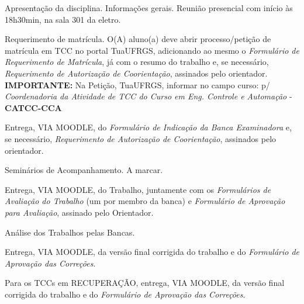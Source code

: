 

    {Apresentação da disciplina. Informações gerais. Reunião presencial com início às 18h30min, na sala 301 da eletro.}

    {Requerimento de matrícula. O(A) aluno(a) deve abrir processo/petição de matrícula em TCC no portal TuaUFRGS, adicionando ao mesmo o \emph{Formulário de Requerimento de Matrícula}, já com o resumo do trabalho e, se necessário, \emph{Requerimento de Autorização de Coorientação}, assinados pelo orientador.
    \newline \textbf{IMPORTANTE:} Na Petição, TuaUFRGS, informar no campo curso: p/ \emph{Coordenadoria da Atividade de TCC do Curso em Eng. Controle e Automação} - \textbf{CATCC-CCA}
     }


    {Entrega, VIA MOODLE, do  \emph{Formulário de Indicação da Banca Examinadora} e, se necessário, \emph{Requerimento de Autorização de Coorientação}, assinados pelo orientador. }

    {
     Seminários de Acompanhamento. A marcar. 
    }

    {Entrega, VIA MOODLE, do Trabalho, juntamente com os \emph{Formulários de Avaliação do Trabalho} (um por membro da banca) e \emph{Formulário de Aprovação para Avaliação}, assinado pelo Orientador.}

    {Análise dos Trabalhos pelas Bancas.}%

    {Entrega, VIA MOODLE, da versão final corrigida do trabalho e do \emph{Formulário de Aprovação das Correções}.}

    {Para os TCCs em RECUPERAÇÃO, entrega, VIA MOODLE, da versão final corrigida do trabalho e do \emph{Formulário de Aprovação das Correções}.}


